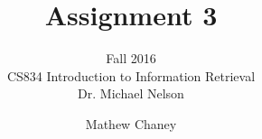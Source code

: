 \documentclass[10pt,letterpaper,bibliography=totocnumbered]{scrartcl}
\begin{document}
\author{Mathew Chaney}
\title{Assignment 3}
\subtitle{Fall 2016\\ CS834 Introduction to Information Retrieval\\ Dr. Michael Nelson}
\maketitle
\newpage

\tableofcontents
\listoffigures
\lstlistoflistings
\listoftables








\end{document}
